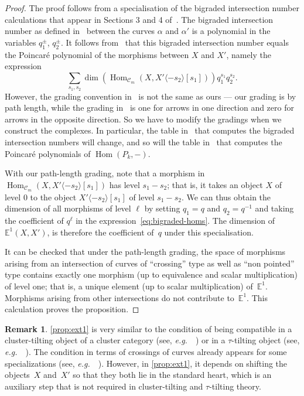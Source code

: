 \documentclass{amsart}
\theoremstyle{definition}
\newtheorem{remark}[theorem]{Remark}
\DeclareMathOperator{\Hom}{Hom} %
\newcommand{\eg}{\textit{e.g.}~} %
\begin{document}
\begin{proof}
  The proof follows from a specialisation of the bigraded intersection number calculations that appear in Sections 3 and 4 of~\cite{kho.sei:02}.
  The bigraded intersection number as defined in~\cite[Sect.~3d]{kho.sei:02} between the curves \(\alpha\) and \(\alpha'\) is a polynomial in the variables \(q_1^{\pm}\), \(q_2^{\pm}\).
  It follows from~\cite[Prop.~4.9]{kho.sei:02} that this bigraded intersection number equals the Poincar{\'e} polynomial of the morphisms between \(X\) and \(X'\), namely the expression
  \begin{equation}
    \label{eq:bigraded-homs}
  \sum_{s_1,s_2}\dim(\Hom_{\mathcal{C}_m}(X,X'\langle -s_2 \rangle[s_1]))q_1^{s_1}q_2^{s_2}.    
\end{equation}
However, the grading convention in~\cite{kho.sei:02} is not the same as ours --- our grading is by path length, while the grading in~\cite{kho.sei:02} is one for arrows in one direction and zero for arrows in the opposite direction.
So we have to modify the gradings when we construct the complexes.
In particular, the table in~\cite[Lem.~3.20]{kho.sei:02} that computes the bigraded intersection numbers will change, and so will the table in~\cite[Lem.~4.12]{kho.sei:02} that computes the Poincar{\'e} polynomials of \(\Hom(P_k,-)\).

With our path-length grading, note that a morphism in \(\Hom_{\mathcal{C}_m}(X,X'\langle -s_2 \rangle[s_1])\) has level \(s_1 - s_2\); that is, it takes an object \(X\) of level \(0\) to the object \(X'\langle -s_2 \rangle[s_1]\) of level \(s_1 - s_2\).
  We can thus obtain the dimension of all morphisms of level \(\ell\) by setting \(q_1 = q\) and \(q_2 = q^{-1}\) and taking the coefficient of \(q^{\ell}\) in the expression~\eqref{eq:bigraded-homs}.
    The dimension of \(\mathbb{E}^1(X,X')\), is therefore the coefficient of~\(q\) under this specialisation.

It can be checked that under the path-length grading, the space of morphisms arising from an intersection of curves of ``crossing'' type as well as ``non pointed'' type contains exactly one morphism (up to equivalence and scalar multiplication) of level one; that is, a unique element (up to scalar multiplication) of~\(\mathbb{E}^1\).
Morphisms arising from other intersections do not contribute to~\(\mathbb{E}^1\).
This calculation proves the proposition.
\end{proof}

\begin{remark}
  \cref{prop:ext1} is very similar to the condition of being compatible in a cluster-tilting object of a cluster category (see, \eg~\cite[Cor.~4.3]{bua.mar.rei.ea:06}) or in a $\tau$-tilting object (see, \eg~\cite{AdachiIyamaReiten}).
  The condition in terms of crossings of curves already appears for some specializations (see, \eg~\cite{FominShapiroThurston, PaluPilaudPlamondon-surfaces}).
  However, in \cref{prop:ext1}, it depends on shifting the objects~\(X\) and~\(X'\) so that they both lie in the standard heart, which is an auxiliary step that is not required in cluster-tilting and $\tau$-tilting theory.
\end{remark}
\end{document}
